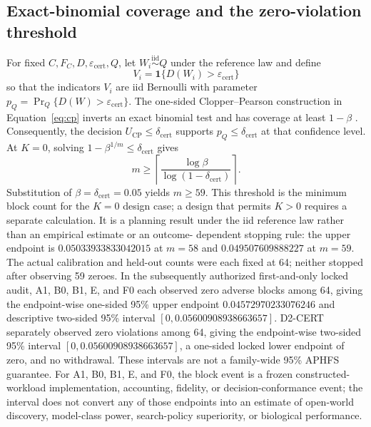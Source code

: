 \subsection{Exact-binomial coverage and the zero-violation threshold}

For fixed \(C,F_C,D,\varepsilon_{\mathrm{cert}},Q\), let \(W_i\overset{\mathrm{iid}}{\sim}Q\) under the
reference law and define
\[
V_i=\mathbf 1\{D(W_i)>\varepsilon_{\mathrm{cert}}\}
\]
so that the indicators \(V_i\) are iid Bernoulli with parameter
\(p_Q=\Pr_Q\{D(W)>\varepsilon_{\mathrm{cert}}\}\). The one-sided Clopper--Pearson construction in
Equation~\eqref{eq:cp} inverts an exact binomial test and has coverage at least \(1-\beta\)
\citep{clopper1934}.
Consequently, the decision \(U_{\mathrm{CP}}\le\delta_{\mathrm{cert}}\) supports
\(p_Q\le\delta_{\mathrm{cert}}\) at that confidence level. At \(K=0\), solving
\(1-\beta^{1/m}\le\delta_{\mathrm{cert}}\) gives
\[
m\ge \left\lceil\frac{\log\beta}{\log(1-\delta_{\mathrm{cert}})}\right\rceil.
\]
Substitution of \(\beta=\delta_{\mathrm{cert}}=0.05\) yields \(m\ge59\). This threshold is the minimum block count
for the \(K=0\) design case; a design that permits \(K>0\) requires a separate calculation. It is
a planning result under the iid reference law rather than an empirical estimate or an outcome-
dependent stopping rule: the upper endpoint is \(0.05033933833042015\) at \(m=58\) and
\(0.049507609888227\) at \(m=59\). The actual calibration and held-out counts were each fixed at
64; neither stopped after observing 59 zeroes. In the
subsequently authorized first-and-only
locked audit, A1, B0, B1, E, and F0 each observed zero adverse blocks among 64, giving the
endpoint-wise one-sided 95\% upper endpoint
\(0.04572970233076246\) and descriptive two-sided 95\% interval
\([0,0.05600908938663657]\). D2-CERT separately observed zero violations among 64, giving the
endpoint-wise two-sided 95\% interval \([0,0.05600908938663657]\), a one-sided locked lower
endpoint of zero, and no withdrawal. These intervals are not a family-wide 95\% APHFS guarantee.
For A1, B0, B1, E, and F0, the block event is a frozen constructed-workload
implementation, accounting, fidelity, or decision-conformance event; the interval does not convert
any of those endpoints into an estimate of open-world discovery, model-class power, search-policy
superiority, or biological performance.

